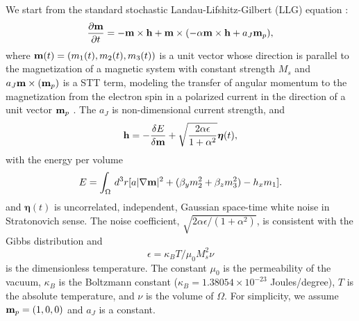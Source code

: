 \documentclass[journal,transmag]{IEEEtran}
\begin{document}
We start from the standard stochastic Landau-Lifshitz-Gilbert (LLG) equation \cite{GaraCervera2007NumericalMA} :
\begin{equation}
\frac{\partial{\bf{m}}}{\partial t} = - {\bf{m}}\times{\bf{h}} + {\bf{m}}\times(-\alpha{\bf{m}}\times{\bf{h}} + a_J {\bf{m}}_p),
\label{eq:LLG}
\end{equation}
where ${\bf{m}}(t) = (m_1(t),m_2(t),m_3(t))$ is a unit vector whose direction is parallel to the magnetization of a magnetic system with constant strength $M_s$ and $a_J  {\bf{m}}\times( {\bf{m}}_p)$ is a STT term, modeling the transfer of angular momentum to the magnetization from the electron spin in a polarized current in the direction of a unit vector ${\bf{m}}_p$  \cite{Newhall_Eric}. The $a_J$ is  non-dimensional current strength, and  \begin{align}
{\bf{h}} = -\frac{\delta E}{\delta {\bf{m}}} + \sqrt{\frac{2\alpha \epsilon}{1+\alpha^2}}\boldsymbol{\eta}(t),
\end{align}
with the energy per volume 
\begin{align} 
E = \int_{\Omega}\,d^3r [a|\nabla{\bf{m}}|^2 + (\beta_y m_2^2+\beta_z m_3^2) - h_x m_1].
\label{E:nonuniform}
\end{align}
and 
$\boldsymbol{\eta}(t)$ is uncorrelated, independent, Gaussian space-time white noise in Stratonovich sense. 
The noise coefficient, $\sqrt{{2\alpha \epsilon}/(1+\alpha^2)}$, is consistent with the Gibbs distribution and 
$$
\epsilon = \kappa_B T/\mu_0 M_s^2\nu
$$
is the dimensionless temperature. The constant $\mu_0$ is the permeability of the vacuum, $\kappa_B$ is the Boltzmann constant ($\kappa_B = 1.38054 \times 10^{-23}$ Joules/degree), $T$ is the absolute temperature, and $\nu$ is the volume of $\Omega$.
For simplicity, we assume ${\bf{m}}_p = (1,0,0)$ and  $a_J$ is a constant.
\end{document}
